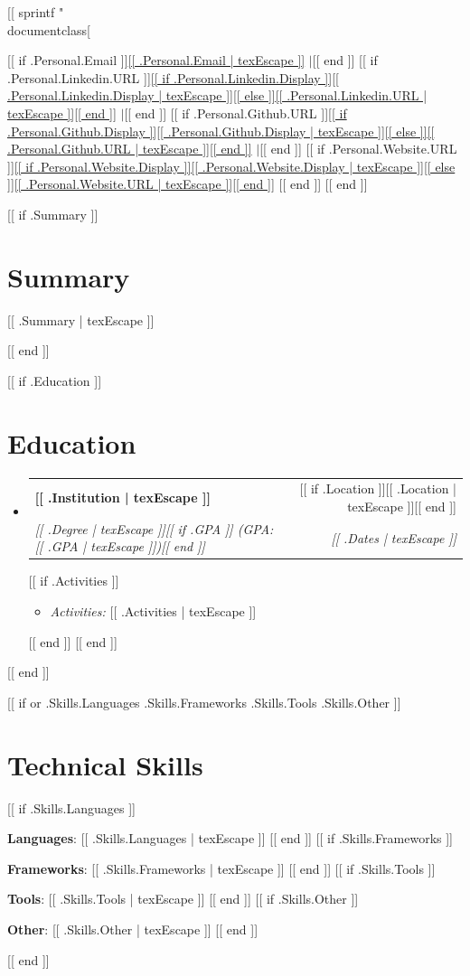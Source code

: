 [[ sprintf "\\documentclass[%
\makeatletter
\newcommand{\resumeItem}[1]{
  \item\small{
    {#1 \vspace{-2pt}}
  }
}
\newcommand{\resumeSubheading}[4]{
  \vspace{-1pt}\item
    \begin{tabular*}{0.97\textwidth}[t]{l@{\extracolsep{\fill}}r}
      \textbf{#1} & #2 \\
      \textit{\small#3} & \textit{\small #4} \\
    \end{tabular*}\vspace{-7pt}
}
\newcommand{\resumeSubHeadingListStart}{\begin{itemize}[leftmargin=0.15in, label={}]}
\newcommand{\resumeSubHeadingListEnd}{\end{itemize}}
\newcommand{\resumeItemListStart}{\begin{itemize}}
\newcommand{\resumeItemListEnd}{\end{itemize}\vspace{-5pt}}
\makeatother
\begin{document}
\begin{center}
    [[ if .Personal.Email ]]\href{mailto:[[ .Personal.Email | texEscape ]]}{[[ .Personal.Email | texEscape ]]} $|$[[ end ]]
    [[ if .Personal.Linkedin.URL ]]\href{[[ .Personal.Linkedin.URL | texEscape ]]}{[[ if .Personal.Linkedin.Display ]][[ .Personal.Linkedin.Display | texEscape ]][[ else ]][[ .Personal.Linkedin.URL | texEscape ]][[ end ]]} $|$[[ end ]]
    [[ if .Personal.Github.URL ]]\href{[[ .Personal.Github.URL | texEscape ]]}{[[ if .Personal.Github.Display ]][[ .Personal.Github.Display | texEscape ]][[ else ]][[ .Personal.Github.URL | texEscape ]][[ end ]]} $|$[[ end ]]
    [[ if .Personal.Website.URL ]]\href{[[ .Personal.Website.URL | texEscape ]]}{[[ if .Personal.Website.Display ]][[ .Personal.Website.Display | texEscape ]][[ else ]][[ .Personal.Website.URL | texEscape ]][[ end ]]} [[ end ]]
[[ end ]]
\end{center}


[[ if .Summary ]]
\section{Summary}
\begin{itemize}[leftmargin=0.15in, label={}]
    \small{\item{
    [[ .Summary | texEscape ]]
    }}
\end{itemize}
[[ end ]]

[[ if .Education ]]
\section{Education}
  \resumeSubHeadingListStart
    [[ range .Education ]]
    \resumeSubheading
      {[[ .Institution | texEscape ]]}{[[ if .Location ]][[ .Location | texEscape ]][[ end ]]}
      {[[ .Degree | texEscape ]][[ if .GPA ]] (GPA: [[ .GPA | texEscape ]])[[ end ]]}{[[ .Dates | texEscape ]]}
      [[ if .Activities ]]
      \resumeItemListStart
        \resumeItem{\textit{Activities:} [[ .Activities | texEscape ]]}
      \resumeItemListEnd
      [[ end ]]
    [[ end ]]
  \resumeSubHeadingListEnd
[[ end ]]


[[ if or .Skills.Languages .Skills.Frameworks .Skills.Tools .Skills.Other ]]
\section{Technical Skills}
 \begin{itemize}[leftmargin=0.15in, label={}]
    \small{
     [[ if .Skills.Languages ]]\item \textbf{Languages}{: [[ .Skills.Languages | texEscape ]]} [[ end ]]
     [[ if .Skills.Frameworks ]]\item \textbf{Frameworks}{: [[ .Skills.Frameworks | texEscape ]]} [[ end ]]
     [[ if .Skills.Tools ]]\item \textbf{Tools}{: [[ .Skills.Tools | texEscape ]]} [[ end ]]
     [[ if .Skills.Other ]]\item \textbf{Other}{: [[ .Skills.Other | texEscape ]]} [[ end ]]
    }
 \end{itemize}
[[ end ]]
\end{document}
